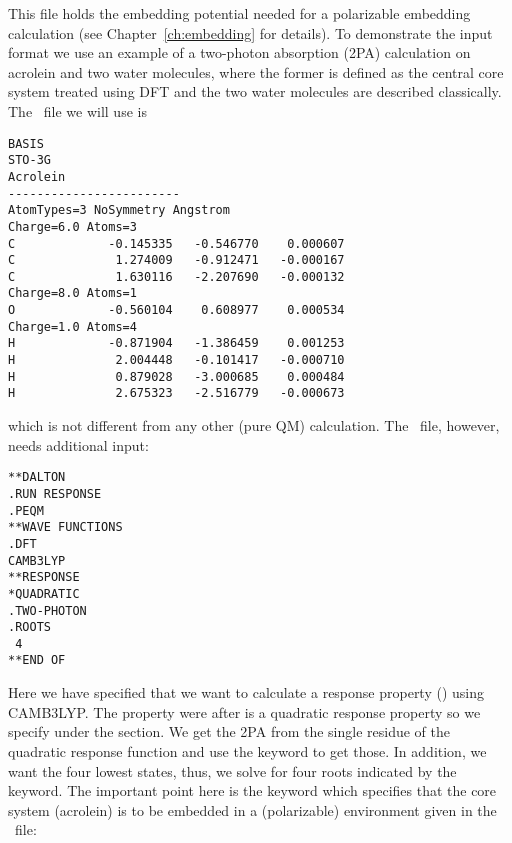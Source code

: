 This file holds the embedding potential needed for a polarizable embedding
calculation (see Chapter~\ref{ch:embedding} for details). To demonstrate the
input format we use an example of a two-photon absorption (2PA) calculation
on acrolein and two water molecules, where the former is defined as the central core system treated using DFT and the two water molecules are described classically. The \molinp\ file we will use is
\begin{verbatim}
BASIS
STO-3G
Acrolein
------------------------
AtomTypes=3 NoSymmetry Angstrom
Charge=6.0 Atoms=3
C             -0.145335   -0.546770    0.000607
C              1.274009   -0.912471   -0.000167
C              1.630116   -2.207690   -0.000132
Charge=8.0 Atoms=1
O             -0.560104    0.608977    0.000534
Charge=1.0 Atoms=4
H             -0.871904   -1.386459    0.001253
H              2.004448   -0.101417   -0.000710
H              0.879028   -3.000685    0.000484
H              2.675323   -2.516779   -0.000673
\end{verbatim}
which is not different from any other (pure QM) calculation. The \dalinp\ file, however, needs additional input:
\begin{verbatim}
**DALTON
.RUN RESPONSE
.PEQM
**WAVE FUNCTIONS
.DFT
CAMB3LYP
**RESPONSE
*QUADRATIC
.TWO-PHOTON
.ROOTS
 4
**END OF
\end{verbatim}
Here we have specified that we want to calculate a response property 
() using CAMB3LYP. The property were after is a quadratic 
response property so we specify  under the  
section. We get the 2PA from the single residue of the quadratic response 
function and use the  keyword to get those. In addition, we 
want the four lowest states, thus, we solve for four roots indicated by the 
 keyword. The important point here is the  keyword which 
specifies that the core system (acrolein) is to be embedded in a (polarizable) environment given in the \potinp\ file:
